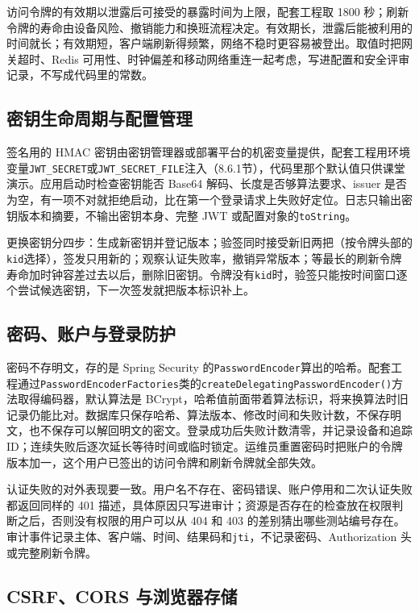 访问令牌的有效期以泄露后可接受的暴露时间为上限，配套工程取 1800 秒；刷新令牌的寿命由设备风险、撤销能力和换班流程决定。有效期长，泄露后能被利用的时间就长；有效期短，客户端刷新得频繁，网络不稳时更容易被登出。取值时把网关超时、Redis 可用性、时钟偏差和移动网络重连一起考虑，写进配置和安全评审记录，不写成代码里的常数。

\subsection{密钥生命周期与配置管理}

签名用的 HMAC 密钥由密钥管理器或部署平台的机密变量提供，配套工程用环境变量\texttt{JWT\_SECRET}或\texttt{JWT\_SECRET\_FILE}注入（8.6.1节），代码里那个默认值只供课堂演示。应用启动时检查密钥能否 Base64 解码、长度是否够算法要求、issuer 是否为空，有一项不对就拒绝启动，比在第一个登录请求上失败好定位。日志只输出密钥版本和摘要，不输出密钥本身、完整 JWT 或配置对象的\texttt{toString}。

更换密钥分四步：生成新密钥并登记版本；验签同时接受新旧两把（按令牌头部的\texttt{kid}选择），签发只用新的；观察认证失败率，撤销异常版本；等最长的刷新令牌寿命加时钟容差过去以后，删除旧密钥。令牌没有\texttt{kid}时，验签只能按时间窗口逐个尝试候选密钥，下一次签发就把版本标识补上。

\subsection{密码、账户与登录防护}

密码不存明文，存的是 Spring Security 的\texttt{PasswordEncoder}算出的哈希。配套工程通过\texttt{PasswordEncoderFactories}类的\texttt{createDelegatingPasswordEncoder()}方法取得编码器，默认算法是 BCrypt，哈希值前面带着算法标识，将来换算法时旧记录仍能比对。数据库只保存哈希、算法版本、修改时间和失败计数，不保存明文，也不保存可以解回明文的密文。登录成功后失败计数清零，并记录设备和追踪 ID；连续失败后逐次延长等待时间或临时锁定。运维员重置密码时把账户的令牌版本加一，这个用户已签出的访问令牌和刷新令牌就全部失效。

认证失败的对外表现要一致。用户名不存在、密码错误、账户停用和二次认证失败都返回同样的 401 描述，具体原因只写进审计；资源是否存在的检查放在权限判断之后，否则没有权限的用户可以从 404 和 403 的差别猜出哪些测站编号存在。审计事件记录主体、客户端、时间、结果码和\texttt{jti}，不记录密码、Authorization 头或完整刷新令牌。

\subsection{CSRF、CORS 与浏览器存储}


